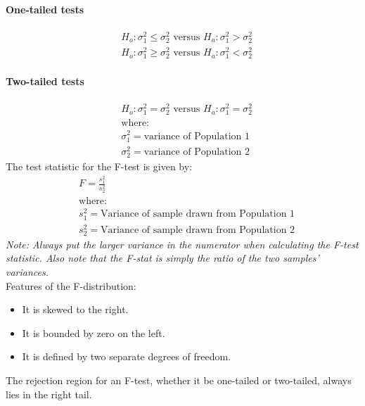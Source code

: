 \paragraph{One-tailed tests} %
\label{par:One-tailed tests}
\begin{align*}
	 & H_o: \sigma^2_1 \leq \sigma^2_2 \text{ versus } H_a: \sigma^2_1 > \sigma^2_2 \\
	 & H_o: \sigma^2_1 \geq \sigma^2_2 \text{ versus } H_a: \sigma^2_1 < \sigma^2_2
\end{align*}
\paragraph{Two-tailed tests} %
\label{par:Two-tailed tests}
\begin{align*}
	 & H_o: \sigma^2_1 = \sigma^2_2 \text{ versus } H_a: \sigma^2_1 = \sigma^2_2 \\
	 & \text{where:}                                                           \\
	 & \sigma^2_1 = \text{variance of Population 1}                            \\
	 & \sigma^2_2 = \text{variance of Population 2}
\end{align*}
The test statistic for the F-test is given by:
\begin{align*}
	 & F = \frac{s^2_1}{s^2_2}                                   \\
	 & \text{where:}                                             \\
	 & s^2_1 = \text{Variance of sample drawn from Population 1} \\
	 & s^2_2 = \text{Variance of sample drawn from Population 2}
\end{align*}
\textit{Note: Always put the larger variance in the numerator when calculating the F-test statistic.
	Also note that the F-stat is simply the ratio of the two samples' variances.}\\
Features of the F-distribution:
\begin{itemize}
	\item It is skewed to the right.
	\item It is bounded by zero on the left.
	\item It is defined by two separate degrees of freedom.
\end{itemize}
The rejection region for an F-test, whether it be one-tailed or two-tailed, always lies in the right tail.
